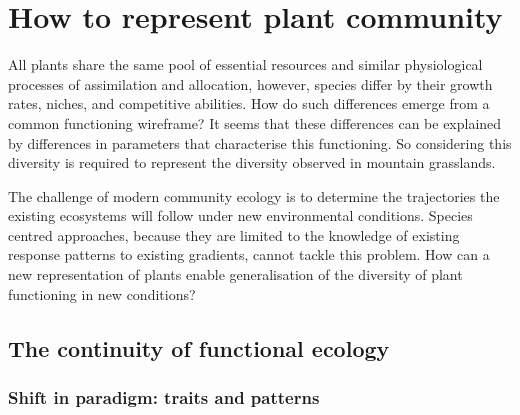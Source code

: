  

\chapter{How to represent plant community}

All plants share the same pool of essential resources and similar physiological processes of assimilation and allocation, however, species differ by their growth rates, niches, and competitive abilities. How do such differences emerge from a common functioning wireframe? It seems that these differences can be explained by differences in parameters that characterise this functioning. So considering this diversity is required to represent the diversity observed in mountain grasslands.

 The challenge of modern community ecology is to determine the trajectories the existing ecosystems will follow under new environmental conditions. Species centred approaches, because they are limited to the knowledge of existing response patterns to existing gradients, cannot tackle this problem. How can a new representation of plants enable generalisation of the diversity of plant functioning in new conditions?

\section{The continuity of functional ecology}

\subsection{Shift in paradigm: traits and patterns}



